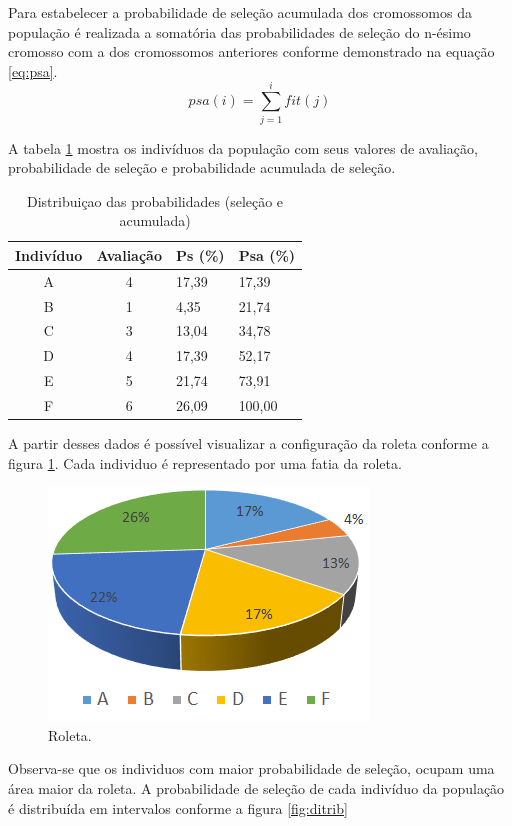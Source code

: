 \documentclass[twoside]{article}
\begin{document}
\begin{multicols}{2}
Para estabelecer a probabilidade de seleção acumulada dos cromossomos da população é realizada a somatória das probabilidades de seleção do n-ésimo cromosso com a dos cromossomos anteriores conforme demonstrado na equação \ref{eq:psa}.
\begin{equation}
\label{eq:psa}
psa(i) = \sum\limits_{j=1}^i fit(j)
\end{equation}

A tabela \ref{tab:popinfo} mostra os indivíduos da população com seus valores de avaliação, probabilidade de seleção e probabilidade acumulada de seleção.
\begin{table}[H]
\label{tab:popinfo}
\caption{Distribuiçao das probabilidades (seleção e acumulada)}
\centering
\begin{tabular}{ccll}
\toprule
Indivíduo & Avaliação & Ps (\%) & Psa (\%) \\
\midrule
A & 4 & 17,39 & 17,39\\
B & 1 & 4,35 & 21,74\\
C & 3 & 13,04 & 34,78\\
D & 4 & 17,39 & 52,17\\
E & 5 & 21,74 & 73,91\\
F & 6 & 26,09 & 100,00\\
\bottomrule
\end{tabular}
\end{table}

A partir desses dados é possível visualizar a configuração da roleta conforme a figura \ref{fig:roleta}. Cada individuo é representado por uma fatia da roleta.

\begin{figure}[H]
\label{fig:roleta}
  \caption{Roleta.}
  \centering
    \includegraphics[scale = 0.8]{roleta.png}
\end{figure}

Observa-se que os individuos com maior probabilidade de seleção, ocupam uma área maior da roleta. A probabilidade de seleção de cada indivíduo da população é distribuída em intervalos conforme a figura \ref{fig:ditrib}


\end{multicols}
\end{document}
